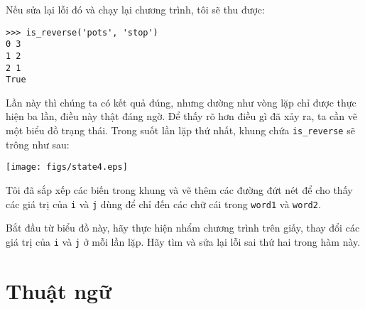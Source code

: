 \documentclass[11pt]{book}
\begin{document}

Nếu sửa lại lỗi đó và chạy lại chương trình, tôi sẽ thu được:

\beforeverb
\begin{verbatim}
>>> is_reverse('pots', 'stop')
0 3
1 2
2 1
True
\end{verbatim}
\afterverb
%
Lần này thì chúng ta có kết quả đúng, nhưng dường như vòng lặp
chỉ được thực hiện ba lần, điều này thật đáng ngờ. Để thấy rõ hơn
điều gì đã xảy ra, ta cần vẽ một biểu đồ trạng thái. Trong suốt lần
lặp thứ nhất, khung chứa \verb"is_reverse" sẽ trông như sau:


\beforefig
\centerline{\texttt{[image: figs/state4.eps]}}
\afterfig

Tôi đã sắp xếp các biến trong khung và vẽ thêm các
đường đứt nét để cho thấy các giá trị của {\tt i} và
{\tt j} dùng để chỉ đến các chữ cái trong {\tt word1} và {\tt word2}.

\begin{ex}
\label{is_reverse}
Bắt đầu từ biểu đồ này, hãy thực hiện nhẩm chương trình trên giấy, thay
đổi các giá trị của {\tt i} và {\tt j} ở mỗi lần lặp. Hãy tìm và sửa lại lỗi sai
thứ hai trong hàm này.
\end{ex}



\section{Thuật ngữ}
\end{document}
